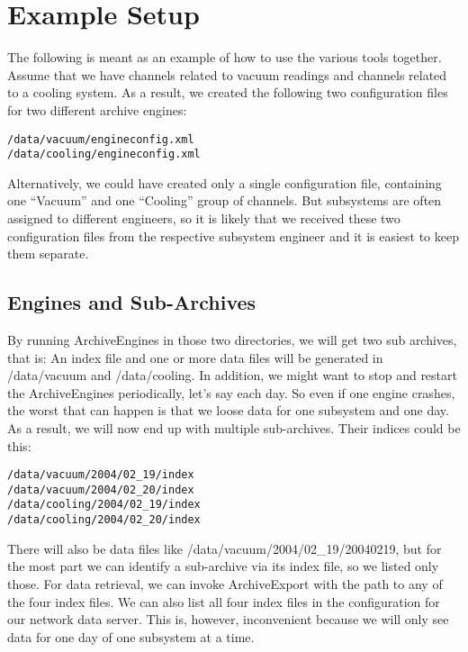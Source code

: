 \chapter{Example Setup} \label{ch:examplesetup}
The following is meant as an example of how to use the various tools
together. Assume that we have channels related to vacuum readings and
channels related to a cooling system. As a result, we created the
following two configuration files for two different archive engines:
\begin{lstlisting}[frame=none,keywordstyle=\sffamily]
/data/vacuum/engineconfig.xml
/data/cooling/engineconfig.xml
\end{lstlisting}

\noindent Alternatively, we could have created only a single
configuration file, containing one ``Vacuum'' and one ``Cooling'' group of
channels. But subsystems are often assigned to different engineers, so
it is likely that we received these two configuration files from the
respective subsystem engineer and it is easiest to keep them separate.

\section{Engines and Sub-Archives}
By running ArchiveEngines in those two directories, we will get two
sub archives, that is: An index file and one or more data files will
be generated in /data/vacuum and /data/cooling.  In addition,
we might want to stop and restart the ArchiveEngines periodically,
let's say each day.  So even if one engine crashes, the worst that can
happen is that we loose data for one subsystem and one day. As a
result, we will now end up with multiple sub-archives. Their indices
could be this:
\begin{lstlisting}[frame=none,keywordstyle=\sffamily]
/data/vacuum/2004/02_19/index
/data/vacuum/2004/02_20/index
/data/cooling/2004/02_19/index
/data/cooling/2004/02_20/index
\end{lstlisting}

\noindent There will also be data files like
/data/vacuum/2004/02\_19/20040219, but for the most part we can
identify a sub-archive via its index file, so we listed only those.
For data retrieval, we can invoke ArchiveExport with the
path to any of the four index files. We can also list all four index
files in the configuration for our network data server. This is,
however, inconvenient because we will only see data for one day of one
subsystem at a time. 

